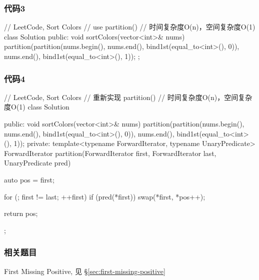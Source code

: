 \subsubsection{代码3}
\begin{Code}
// LeetCode, Sort Colors
// use partition()
// 时间复杂度O(n)，空间复杂度O(1)
class Solution {
public:
    void sortColors(vector<int>& nums) {
        partition(partition(nums.begin(), nums.end(), bind1st(equal_to<int>(), 0)),
                nums.end(), bind1st(equal_to<int>(), 1));
    }
};
\end{Code}


\subsubsection{代码4}
\begin{Code}
// LeetCode, Sort Colors
// 重新实现 partition()
// 时间复杂度O(n)，空间复杂度O(1)
class Solution {
public:
    void sortColors(vector<int>& nums) {
        partition(partition(nums.begin(), nums.end(), bind1st(equal_to<int>(), 0)),
                 nums.end(), bind1st(equal_to<int>(), 1));
    }
private:
    template<typename ForwardIterator, typename UnaryPredicate>
    ForwardIterator partition(ForwardIterator first, ForwardIterator last,
            UnaryPredicate pred) {
        auto pos = first;

        for (; first != last; ++first)
            if (pred(*first))
                swap(*first, *pos++);

        return pos;
    }
};
\end{Code}


\subsubsection{相关题目}
\begindot
\item First Missing Positive, 见 \S \ref{sec:first-missing-positive}
\myenddot
